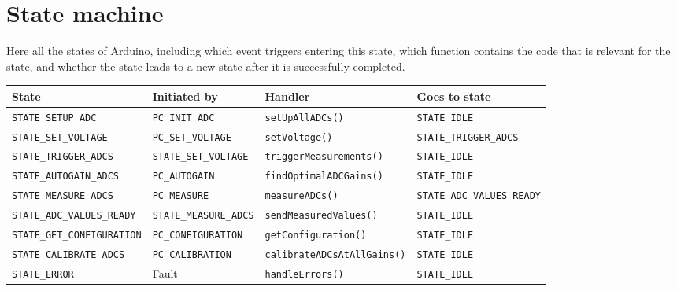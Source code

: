 \documentclass[11pt,a4paper,english]{article}
\begin{document}
\clearpage

\section{State machine}\label{sec:state_machine}
Here all the states of Arduino, including which event triggers entering this state, which function contains the code that is relevant for the state, and whether the state leads to a new state after it is successfully completed.
\begin{center}
\begin{tabular}{llll}\toprule
State					        & Initiated by                 & Handler                            & Goes to state        \\\midrule
\texttt{STATE\_SETUP\_ADC}      & \texttt{PC\_INIT\_ADC}       & \texttt{setUpAllADCs()}            & \texttt{STATE\_IDLE} \\
\texttt{STATE\_SET\_VOLTAGE}    & \texttt{PC\_SET\_VOLTAGE}    & \texttt{setVoltage()}              & \texttt{STATE\_TRIGGER\_ADCS}\\
\texttt{STATE\_TRIGGER\_ADCS}   & \texttt{STATE\_SET\_VOLTAGE} & \texttt{triggerMeasurements()}     & \texttt{STATE\_IDLE} \\
\texttt{STATE\_AUTOGAIN\_ADCS}  & \texttt{PC\_AUTOGAIN}        & \texttt{findOptimalADCGains()}     & \texttt{STATE\_IDLE} \\
\texttt{STATE\_MEASURE\_ADCS}   & \texttt{PC\_MEASURE} 		   & \texttt{measureADCs()}   & \texttt{STATE\_ADC\_VALUES\_READY}\\
\texttt{STATE\_ADC\_VALUES\_READY} & \texttt{STATE\_MEASURE\_ADCS} & \texttt{sendMeasuredValues()}  & \texttt{STATE\_IDLE}\\
\texttt{STATE\_GET\_CONFIGURATION} & \texttt{PC\_CONFIGURATION}    & \texttt{getConfiguration()}    & \texttt{STATE\_IDLE}\\
\texttt{STATE\_CALIBRATE\_ADCS} & \texttt{PC\_CALIBRATION}     & \texttt{calibrateADCsAtAllGains()} & \texttt{STATE\_IDLE}\\
\texttt{STATE\_ERROR}           & Fault                        & \texttt{handleErrors()}            & \texttt{STATE\_IDLE}\\
\bottomrule
\end{tabular}
\end{center}
\end{document}
